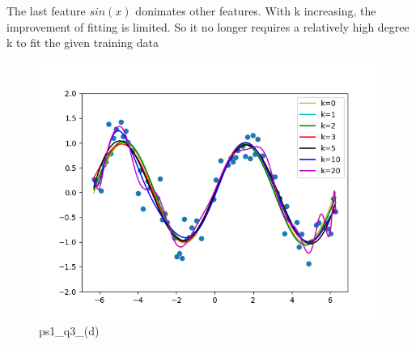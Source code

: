 \begin{answer}

The last feature $sin(x)$ donimates other features. With k increasing, the improvement of fitting is limited. So it no longer requires a relatively high degree k to fit the given training data

\begin{figure}[H]
    \centering
    \includegraphics[width=0.5\linewidth]{ps1_q3_(d).png}
    \caption{ps1\_q3\_(d)}
    \label{fig:enter-label}
\end{figure}
\end{answer}
